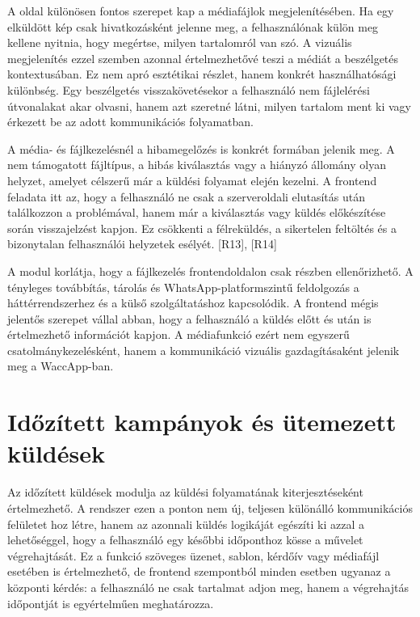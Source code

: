 A  oldal különösen fontos szerepet kap a médiafájlok megjelenítésében. Ha egy elküldött kép csak hivatkozásként jelenne meg, a felhasználónak külön meg kellene nyitnia, hogy megértse, milyen tartalomról van szó. A vizuális megjelenítés ezzel szemben azonnal értelmezhetővé teszi a médiát a beszélgetés kontextusában. Ez nem apró esztétikai részlet, hanem konkrét használhatósági különbség. Egy beszélgetés visszakövetésekor a felhasználó nem fájlelérési útvonalakat akar olvasni, hanem azt szeretné látni, milyen tartalom ment ki vagy érkezett be az adott kommunikációs folyamatban. 

A média- és fájlkezelésnél a hibamegelőzés is konkrét formában jelenik meg. A nem támogatott fájltípus, a hibás kiválasztás vagy a hiányzó állomány olyan helyzet, amelyet célszerű már a küldési folyamat elején kezelni. A frontend feladata itt az, hogy a felhasználó ne csak a szerveroldali elutasítás után találkozzon a problémával, hanem már a kiválasztás vagy küldés előkészítése során visszajelzést kapjon. Ez csökkenti a félreküldés, a sikertelen feltöltés és a bizonytalan felhasználói helyzetek esélyét. [R13], [R14] 

A modul korlátja, hogy a fájlkezelés frontendoldalon csak részben ellenőrizhető. A tényleges továbbítás, tárolás és WhatsApp-platformszintű feldolgozás a háttérrendszerhez és a külső szolgáltatáshoz kapcsolódik. A frontend mégis jelentős szerepet vállal abban, hogy a felhasználó a küldés előtt és után is értelmezhető információt kapjon. A médiafunkció ezért nem egyszerű csatolmánykezelésként, hanem a kommunikáció vizuális gazdagításaként jelenik meg a WaccApp-ban. 

\section{Időzített kampányok és ütemezett küldések}

Az időzített küldések modulja az  küldési folyamatának kiterjesztéseként értelmezhető. A rendszer ezen a ponton nem új, teljesen különálló kommunikációs felületet hoz létre, hanem az azonnali küldés logikáját egészíti ki azzal a lehetőséggel, hogy a felhasználó egy későbbi időponthoz kösse a művelet végrehajtását. Ez a funkció szöveges üzenet, sablon, kérdőív vagy médiafájl esetében is értelmezhető, de frontend szempontból minden esetben ugyanaz a központi kérdés: a felhasználó ne csak tartalmat adjon meg, hanem a végrehajtás időpontját is egyértelműen meghatározza. 

